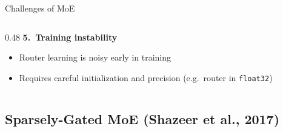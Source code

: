 \begin{frame}{Challenges of MoE}
\begin{columns}
\begin{column}{0.48\textwidth}
      \vspace{0.3em}
      \textbf{5.\ Training instability}
      \begin{itemize}
        \item Router learning is noisy early in training
        \item Requires careful initialization and precision (e.g.\ router in \texttt{float32})
      \end{itemize}
    \end{column}
  \end{columns}
\end{frame}

\subsection{Sparsely-Gated MoE (Shazeer et al., 2017)}


